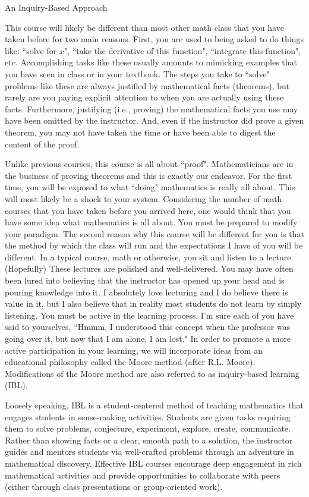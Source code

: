 \begin{section}{An Inquiry-Based Approach}

This course will likely be different than most other math class that you have taken before for two main reasons. First, you are used to being asked to do things like: ``solve for $x$", ``take the derivative of this function", ``integrate this function", etc. Accomplishing tasks like these usually amounts to mimicking examples that you have seen in class or in your textbook. The steps you take to ``solve" problems like these are always justified by mathematical facts (theorems), but rarely are you paying explicit attention to when you are actually using these facts. Furthermore, justifying (i.e., proving) the mathematical facts you use may have been omitted by the instructor. And, even if the instructor did prove a given theorem, you may not have taken the time or have been able to digest the content of the proof.

Unlike previous courses, this course is all about ``proof". Mathematicians are in the business of proving theorems and this is exactly our endeavor. For the first time, you will be exposed to what ``doing" mathematics is really all about. This will most likely be a shock to your system. Considering the number of math courses that you have taken before you arrived here, one would think that you have some idea what mathematics is all about. You must be prepared to modify your paradigm. The second reason why this course will be different for you is that the method by which the class will run and the expectations I have of you will be different. In a typical course, math or otherwise, you sit and listen to a lecture. (Hopefully) These lectures are polished and well-delivered. You may have often been lured into believing that the instructor has opened up your head and is pouring knowledge into it. I absolutely love lecturing and I do believe there is value in it, but I also believe that in reality most students do not learn by simply listening. You must be active in the learning process. I'm sure each of you have said to yourselves, ``Hmmm, I understood this concept when the professor was going over it, but now that I am alone, I am lost." In order to promote a more active participation in your learning, we will incorporate ideas from an educational philosophy called the Moore method (after R.L. Moore). Modifications of the Moore method are also referred to as inquiry-based learning (IBL).

Loosely speaking, IBL is a student-centered method of teaching mathematics that engages students in sense-making activities.  Students are given tasks requiring them to solve problems, conjecture, experiment, explore, create, communicate.  Rather than showing facts or a clear, smooth path to a solution, the instructor guides and mentors students via well-crafted problems through an adventure in mathematical discovery.  Effective IBL courses encourage deep engagement in rich mathematical activities and provide opportunities to collaborate with peers (either through class presentations or group-oriented work).


\end{section}
